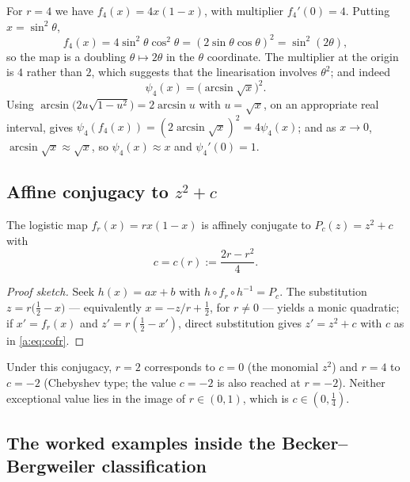 For $r=4$ we have $f_4(x) = 4x(1-x)$, with multiplier $f_4'(0)=4$. Putting
$x=\sin^2\theta$,
\begin{equation*}
f_4(x) = 4\sin^2\theta\cos^2\theta = (2\sin\theta\cos\theta)^2 = \sin^2(2\theta),
\end{equation*}
so the map is a doubling $\theta\mapsto2\theta$ in the $\theta$ coordinate. The
multiplier at the origin is $4$ rather than $2$, which suggests that the
linearisation involves $\theta^2$; and indeed
\begin{equation}
\label{a:eq:psi4}
\psi_4(x) = \bigl(\arcsin\sqrt{x}\bigr)^2 .
\end{equation}
Using $\arcsin\bigl(2u\sqrt{1-u^2}\bigr) = 2\arcsin u$ with $u=\sqrt x$, on an
appropriate real interval, gives
$\psi_4(f_4(x)) = (2\arcsin\sqrt x)^2 = 4\psi_4(x)$; and as $x\to0$,
$\arcsin\sqrt x\approx\sqrt x$, so $\psi_4(x)\approx x$ and $\psi_4'(0)=1$.

\subsection{Affine conjugacy to \texorpdfstring{$z^2+c$}{z\textasciicircum 2+c}}
\label{a:app:affine}

\begin{lemma}
\label{a:lem:affine}
The logistic map $f_r(x) = rx(1-x)$ is affinely conjugate to $P_c(z) = z^2+c$ with
\begin{equation}
\label{a:eq:cofr}
c = c(r) := \frac{2r-r^2}{4} .
\end{equation}
\end{lemma}

\begin{proof}[Proof sketch]
Seek $h(x) = ax+b$ with $h\circ f_r\circ h^{-1} = P_c$. The substitution
$z = r\bigl(\tfrac12-x\bigr)$ --- equivalently $x = -z/r+\tfrac12$, for $r\neq0$ ---
yields a monic quadratic; if $x' = f_r(x)$ and $z' = r(\tfrac12-x')$, direct
substitution gives $z' = z^2+c$ with $c$ as in \cref{a:eq:cofr}.
\end{proof}

Under this conjugacy, $r=2$ corresponds to $c=0$ (the monomial $z^2$) and $r=4$ to
$c=-2$ (Chebyshev type; the value $c=-2$ is also reached at $r=-2$). Neither
exceptional value lies in the image of $r\in(0,1)$, which is $c\in(0,\tfrac14)$.

\subsection{The worked examples inside the Becker--Bergweiler classification}
\label{a:app:classification}

